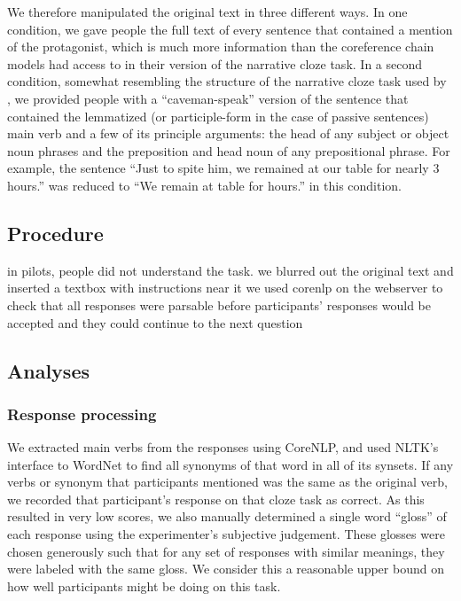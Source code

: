 \documentclass[10pt,a4paper]{article}
\newcommand{\todo}[1]{{\color{red}#1}}
\begin{document}
We therefore manipulated the original text in three different ways.
In one condition, we gave people the full text of every sentence that contained a mention of the protagonist, which is much more information than the coreference chain models had access to in their version of the narrative cloze task. In a second condition, somewhat resembling the structure of the narrative cloze task used by , we provided people with a ``caveman-speak'' version of the sentence that contained the lemmatized (or participle-form in the case of passive sentences) main verb and a few of its principle arguments: the head of any subject or object noun phrases and the preposition and head noun of any prepositional phrase. For example, the sentence ``Just to spite him, we remained at our table for nearly 3 hours.'' was reduced to ``We remain at table for hours.'' in this condition.

\subsection{Procedure}

\todo{
in pilots, people did not understand the task.
we blurred out the original text and inserted a textbox with instructions near it
we used corenlp on the webserver to check that all responses were parsable before participants' responses would be accepted and they could continue to the next question
}

\subsection{Analyses}

\subsubsection{Response processing}

We extracted main verbs from the responses using CoreNLP, and used NLTK's interface to WordNet  to find all synonyms of that word in all of its synsets. If any verbs or synonym that participants mentioned was the same as the original verb, we recorded that participant's response on that cloze task as correct.
As this resulted in very low scores, we also manually determined a single word ``gloss'' of each response using the experimenter's subjective judgement. These glosses were chosen generously such that for any set of responses with similar meanings, they were labeled with the same gloss. We consider this a reasonable upper bound on how well participants might be doing on this task.
\end{document}
